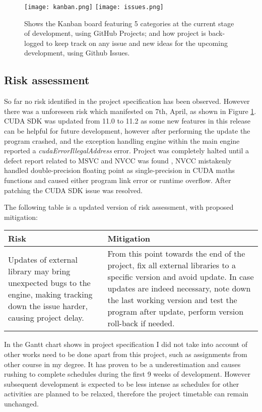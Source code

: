 \documentclass[oneside, a4paper]{article}
\begin{document}
    \begin{figure}[H]
        \texttt{[image: kanban.png]}
        \texttt{[image: issues.png]}
        \caption{Shows the Kanban board featuring 5 categories at the current stage of development, using GitHub Projects; and how project is back-logged to keep track on any issue and new ideas for the upcoming development, using Github Issues.}
        \label{log}
    \end{figure}

    \subsection{Risk assessment}
    So far no risk identified in the project specification has been observed. However there was a unforeseen risk which manifested on 7th, April, as shown in Figure \ref{log}. CUDA SDK was updated from 11.0 to 11.2 as some new features in this release can be helpful for future development, however after performing the update the program crashed, and the exception handling engine within the main engine reported a \textit{cudaErrorIllegalAddress} error. Project was completely halted until a defect report related to MSVC and NVCC was found \cite{cuda1102_defect}, NVCC mistakenly handled double-precision floating point as single-precision in CUDA maths functions and caused either program link error or runtime overflow. After patching the CUDA SDK issue was resolved.

    The following table is a updated version of risk assessment, with proposed mitigation:

    \begin{center}
        \begin{tabular}{ | p{7.5cm} || p{7.5cm} | }
            \hline
            Risk & Mitigation \\
            \hline
            \hline
            Updates of external library may bring unexpected bugs to the engine, making tracking down the issue harder, causing project delay. &
            From this point towards the end of the project, fix all external libraries to a specific version and avoid update. In case updates are indeed necessary, note down the last working version and test the program after update, perform version roll-back if needed. \\
            \hline
        \end{tabular}
    \end{center}

    In the Gantt chart shows in project specification I did not take into account of other works need to be done apart from this project, such as assignments from other course in my degree. It has proven to be a underestimation and causes rushing to complete schedules during the first 9 weeks of development. However subsequent development is expected to be less intense as schedules for other activities are planned to be relaxed, therefore the project timetable can remain unchanged.
\end{document}
